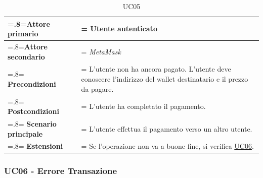                 \begin{table}[H]
                    \centering
                    \renewcommand{\arraystretch}{1.8}
                    \renewcommand\tabularxcolumn[1]{m{#1}}
                    \begin{tabularx}{0.9\textwidth} {
                        >{\hsize=.8\hsize\linewidth=\hsize}X
                        >{\hsize=1.2\hsize\linewidth=\hsize}X}
                        \hline
                        \textbf{Attore primario} & Utente autenticato \\
                        \hline
                        \textbf{Attore secondario} & \textit{MetaMask} \\
                        \hline
                        \textbf{Precondizioni} & L'utente non ha ancora pagato. L'utente deve conoscere l'indirizzo del wallet destinatario e il prezzo da pagare. \\
                        \hline
                        \textbf{Postcondizioni} & L'utente ha completato il pagamento. \\
                        \hline
                        \textbf{Scenario principale} & L'utente effettua il pagamento verso un altro utente. \\
                        \hline
                        \textbf{Estensioni} & Se l'operazione non va a buone fine, si verifica \hyperref[UC06]{UC06}.\\
                        \hline
                    \end{tabularx}
                    \caption{UC05}
                \end{table}

            \subsubsection{UC06 - Errore Transazione}
            \label{UC06}
    
